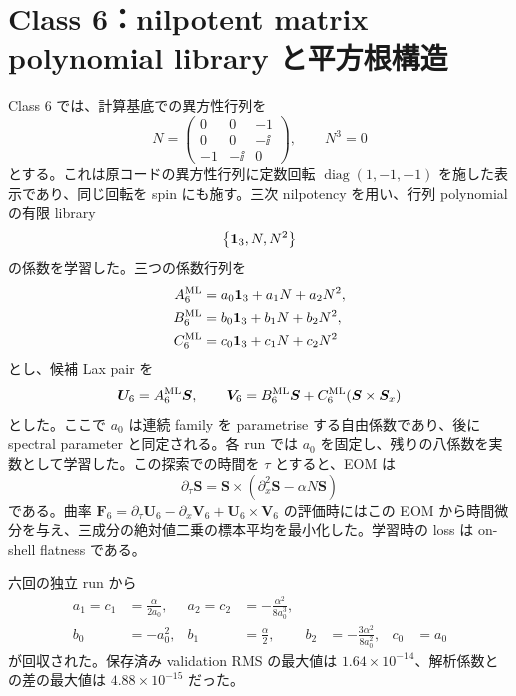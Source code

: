 \section{Class 6：nilpotent matrix polynomial library と平方根構造}
\label{sec:ml-class6}
Class 6 では、計算基底での異方性行列を
\begin{equation}
N=
\begin{pmatrix}
0&0&-1\\
0&0&-\ii\\
-1&-\ii&0
\end{pmatrix},
\qquad
N^3=0
\label{eq:ml6-N}
\end{equation}
とする。これは原コードの異方性行列に定数回転 $\operatorname{diag}(1,-1,-1)$ を施した表示であり、同じ回転を spin にも施す。三次 nilpotency を用い、行列 polynomial の有限 library
\begin{equation}
\left\{\mathbf 1_{3},N,N^2\right\}
\end{equation}
の係数を学習した。三つの係数行列を
\begin{align}
A_6^{\rm ML}&=a_0\mathbf 1_{3}+a_1N+a_2N^2,\\
B_6^{\rm ML}&=b_0\mathbf 1_{3}+b_1N+b_2N^2,\\
C_6^{\rm ML}&=c_0\mathbf 1_{3}+c_1N+c_2N^2
\label{eq:ml6-polynomials}
\end{align}
とし、候補 Lax pair を
\begin{equation}
\boldsymbol U_6=A_6^{\rm ML}\boldsymbol S,
\qquad
\boldsymbol V_6=B_6^{\rm ML}\boldsymbol S
+C_6^{\rm ML}(\boldsymbol S\times\boldsymbol S_x)
\label{eq:ml6-UV}
\end{equation}
とした。ここで $a_0$ は連続 family を parametrise する自由係数であり、後に spectral parameter と同定される。各 run では $a_0$ を固定し、残りの八係数を実数として学習した。この探索での時間を $\tau$ とすると、EOM は
\begin{equation}
\partial_\tau\boldsymbol S
=\boldsymbol S\times(\partial_x^2\boldsymbol S-\alpha N\boldsymbol S)
\end{equation}
である。曲率
$\boldsymbol F_6=\partial_\tau\boldsymbol U_6-\partial_x\boldsymbol V_6
+\boldsymbol U_6\times\boldsymbol V_6$
の評価時にはこの EOM から時間微分を与え、三成分の絶対値二乗の標本平均を最小化した。学習時の loss は on-shell flatness である。

六回の独立 run から
\begin{align}
a_1=c_1&=\frac{\alpha}{2a_0},
&
a_2=c_2&=-\frac{\alpha^2}{8a_0^3},\\
b_0&=-a_0^2,
&
b_1&=\frac{\alpha}{2},
&
b_2&=-\frac{3\alpha^2}{8a_0^2},
&
c_0&=a_0
\label{eq:ml6-relations}
\end{align}
が回収された。保存済み validation RMS の最大値は $1.64\times10^{-14}$、解析係数との差の最大値は $4.88\times10^{-15}$ だった。

